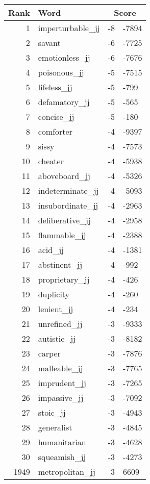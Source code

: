 \begin{longtable}[!htbp]{| rlr@{.}l |}
    \hline
    \textbf{Rank} & \textbf{Word} & \multicolumn{2}{c|}{\textbf{Score}} \\
    \hline
    \endhead
    1 & imperturbable\_jj & -8 & -7894 \\
    2 & savant & -6 & -7725 \\
    3 & emotionless\_jj & -6 & -7676 \\
    4 & poisonous\_jj & -5 & -7515 \\
    5 & lifeless\_jj & -5 & -799 \\
    6 & defamatory\_jj & -5 & -565 \\
    7 & concise\_jj & -5 & -180 \\
    8 & comforter & -4 & -9397 \\
    9 & sissy & -4 & -7573 \\
    10 & cheater & -4 & -5938 \\
    11 & aboveboard\_jj & -4 & -5326 \\
    12 & indeterminate\_jj & -4 & -5093 \\
    13 & insubordinate\_jj & -4 & -2963 \\
    14 & deliberative\_jj & -4 & -2958 \\
    15 & flammable\_jj & -4 & -2388 \\
    16 & acid\_jj & -4 & -1381 \\
    17 & abstinent\_jj & -4 & -992 \\
    18 & proprietary\_jj & -4 & -426 \\
    19 & duplicity & -4 & -260 \\
    20 & lenient\_jj & -4 & -234 \\
    21 & unrefined\_jj & -3 & -9333 \\
    22 & autistic\_jj & -3 & -8182 \\
    23 & carper & -3 & -7876 \\
    24 & malleable\_jj & -3 & -7765 \\
    25 & imprudent\_jj & -3 & -7265 \\
    26 & impassive\_jj & -3 & -7092 \\
    27 & stoic\_jj & -3 & -4943 \\
    28 & generalist & -3 & -4845 \\
    29 & humanitarian & -3 & -4628 \\
    30 & squeamish\_jj & -3 & -4273 \\
    1949 & metropolitan\_jj & 3 & 6609 \\

\end{longtable}
